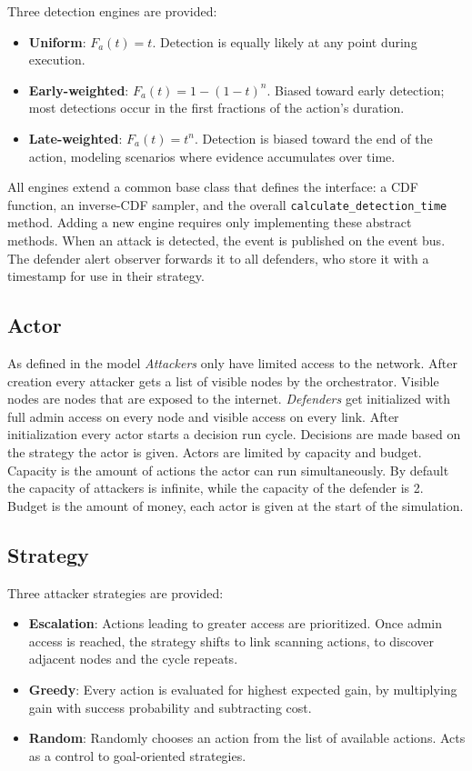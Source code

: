 \documentclass{llncs}
\begin{document}
Three detection engines are provided:
\begin{itemize}
  \item \textbf{Uniform}: $F_a(t) = t$. Detection is equally likely at any point during execution.
  \item \textbf{Early-weighted}: $F_a(t) = 1 - (1-t)^n$. Biased toward early detection; most detections occur in the first fractions of the action's duration.
  \item \textbf{Late-weighted}: $F_a(t) = t^n$. Detection is biased toward the end of the action, modeling scenarios where evidence accumulates over time.

\end{itemize}
All engines extend a common base class that defines the interface: a CDF function, an inverse-CDF sampler, and the overall \texttt{calculate\_detection\_time} method. Adding a new engine requires only implementing these abstract methods.
When an attack is detected, the event is published on the event bus. The defender alert observer forwards it to all defenders, who store it with a timestamp for use in their strategy.

\subsection{Actor}
As defined in the model \emph{Attackers} only have limited access to the network. After creation every attacker gets a list of visible nodes by the orchestrator. Visible nodes are nodes that are exposed to the internet.
\emph{Defenders} get initialized with full admin access on every node and visible access on every link.
After initialization every actor starts a decision run cycle. Decisions are made based on the strategy the actor is given.
Actors are limited by capacity and budget. Capacity is the amount of actions the actor can run simultaneously. By default the capacity of attackers is infinite, while the capacity of the defender is 2. Budget is the amount of money, each actor is given at the start of the simulation.

\subsection{Strategy}
Three attacker strategies are provided:
\begin{itemize}
  \item \textbf{Escalation}: Actions leading to greater access are prioritized. Once admin access is reached, the strategy shifts to link scanning actions, to discover adjacent nodes and the cycle repeats.
  \item \textbf{Greedy}: Every action is evaluated for highest expected gain, by multiplying gain with success probability and subtracting cost.
  \item \textbf{Random}: Randomly chooses an action from the list of available actions. Acts as a control to goal-oriented strategies.
\end{itemize}
\end{document}
